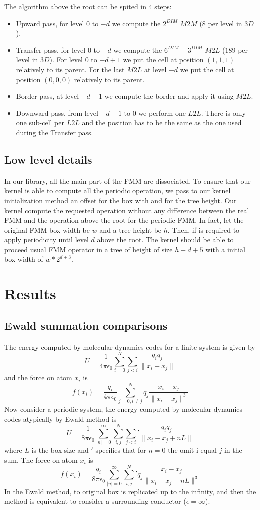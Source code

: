 \documentclass[12pt]{article} %
\begin{document}
The algorithm above the root can be spited in 4 steps:
\begin{itemize}
\item Upward pass, for level $0$ to $-d$ we compute the $2^{DIM}$ $M2M$ ($8$ per level in $3D$).
\item Transfer pass, for level $0$ to $-d$ we compute the $6^{DIM}-3^{DIM}$ $M2L$ ($189$ per level in $3D$).
For level $0$ to $-d+1$ we put the cell at position $(1,1,1)$ relatively to its parent.
For the last $M2L$ at level $-d$ we put the cell at position $(0,0,0)$ relatively to its parent. 
\item Border pass, at level $-d-1$ we compute the border and apply it using $M2L$.
\item Downward pass, from level $-d-1$ to $0$ we perform one $L2L$.
There is only one sub-cell per $L2L$ and the position has to be the same as the one used during the Transfer pass.
\end{itemize}

\subsection{Low level details}

In our library, all the main part of the FMM are dissociated.
To ensure that our kernel is able to compute all the periodic operation, we pass to our kernel initialization method an offset for the box with and
for the tree height.
Our kernel compute the requested operation without any difference between the real FMM and the operation above the root for the periodic FMM.
In fact, let the original FMM box width be $w$ and a tree height be $h$.
Then, if is required to apply periodicity until level $d$ above the root.
The kernel should be able to proceed usual FMM operator in a tree of height of size $h+d+5$ with a initial box width of $w*2^{d+3}$.

\section{Results}
\subsection{Ewald summation comparisons}

The energy computed by molecular dynamics codes for a finite system is given by
$$
U = \frac{1}{4 \pi\epsilon_0}\sum_{i=0}^{N}{\sum_{j<i}{\frac{q_i q_j}{\|x_i-x_j\|}}}
$$ 
and the force on atom $x_i$ is
$$
f(x_i) =  \frac{q_i }{4 \pi\epsilon_0}\sum_{j=0,i\neq j}^{N}{q_j\frac{x_i-x_j}{\|x_i-x_j\|^3}}
$$
Now consider a periodic system, the energy computed by molecular dynamics codes atypically by Ewald method is
$$
U = \frac{1}{8 \pi\epsilon_0}\sum_{|n|=0}^{\infty}{\sum_{i,j}^{N}{\sum_{j<i}{'\frac{q_i q_j}{\|x_i-x_j + n L \| }}}}
$$ 
where $L$ is the box size and ${'}$ specifies that for $n=0$ the omit i equal $j$ in the sum. The force on atom $x_i$ is
$$
f(x_i) =  \frac{q_i}{8 \pi\epsilon_0}\sum_{|n|=0}^{\infty}{\sum_{i,j}^{N}{'q_j\frac{x_i-x_j}{\|x_i-x_j + n L\|^3}}}
$$
In the Ewald method, to original box is replicated up to the infinity, and then the method is equivalent to consider a surrounding conductor ($\epsilon=\infty$). 
\end{document}
